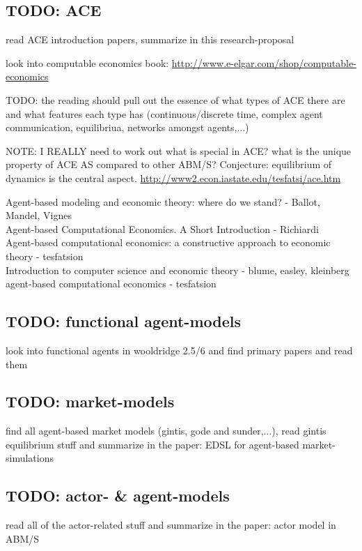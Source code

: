\documentclass{article}
\begin{document}
\subsection{TODO: ACE}
read ACE introduction papers, summarize in this research-proposal

look into computable economics book: \url{http://www.e-elgar.com/shop/computable-economics}

TODO: the reading should pull out the essence of what types of ACE there are and what features each type has (continuous/discrete time, complex agent communication, equilibriua, networks amongst agents,...)

NOTE: I REALLY need to work out what is special in ACE? what is the unique property of ACE AS compared to other ABM/S? Conjecture: equilibrium of dynamics is the central aspect.
\url{http://www2.econ.iastate.edu/tesfatsi/ace.htm}

\cite{mandel_2015} Agent-based modeling and economic theory: where do we stand? - Ballot, Mandel, Vignes \\
\cite{richiardi_2007} Agent-based Computational Economics. A Short Introduction - Richiardi \\
\cite{tesfatsion_2006} Agent-based computational economics: a constructive approach to economic theory - tesfatsion \\
\cite{kleinberg_easley_2015} Introduction to computer science and economic theory - blume, easley, kleinberg \\
\cite{tesfatsion_2002} agent-based computational economics - tesfatsion 

\subsection{TODO: functional agent-models}
look into functional agents in wooldridge 2.5/6 and find primary papers and read them

\subsection{TODO: market-models}
find all agent-based market models (gintis, gode and sunder,...), read gintis equilibrium stuff and summarize in the paper: EDSL for agent-based market-simulations

\subsection{TODO: actor- \& agent-models}
read all of the actor-related stuff and summarize in the paper: actor model in ABM/S
\end{document}

